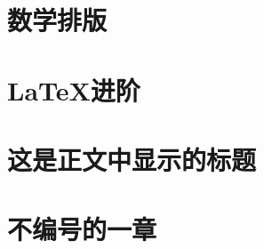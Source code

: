 \documentclass{ctexart}
\begin{document}
\section{数学排版}

\section{\LaTeX 进阶}

\section[这是目录中显示的标题]{这是正文中显示的标题}

\section*{不编号的一章}
\end{document}
